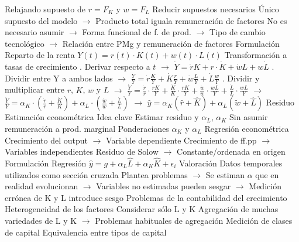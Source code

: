 \documentclass{nuevotema}
\begin{document}
\begin{esquemal}
				\4[] Relajando supuesto de $r=F_K$ y $w=F_L$
				\4 Reducir supuestos necesarios
				\4[] Único supuesto del modelo
				\4[] $\to$ Producto total iguala remuneración de factores
				\4[] No es necesario asumir
				\4[] $\to$ Forma funcional de f. de prod.
				\4[] $\to$ Tipo de cambio tecnológico
				\4[] $\to$ Relación entre PMg y remuneración de factores
			\3 Formulación
				\4 Reparto de la renta
				\4[] $Y(t) = r(t)\cdot K(t) + w(t) \cdot L(t)$
				\4 Transformación a tasas de crecimiento
				. Derivar respecto a $t$
				\4[] $\to$ $\dot{Y} = \dot{r} K + r \cdot \dot{K} + \dot{w} L + w \dot{L}$
				. Dividir entre Y a ambos lados
				\4[] $\to$ $ \frac{\dot{Y}}{Y} = \dot{r} \frac{K}{Y} + \dot{K} \frac{r}{Y} + \dot{w} \frac{L}{Y} + \dot{L} \frac{w}{Y}$
				. Dividir y multiplicar entre $r$, $K$, $w$ y $L$
				\4[] $\to$ $\frac{\dot{Y}}{Y} = \frac{\dot{r}}{r} \cdot \frac{rK}{Y} + \frac{\dot{K}}{K} \cdot \frac{rK}{Y} + \frac{\dot{w}}{w} \cdot \frac{wL}{Y} + \frac{\dot{L}}{L} \cdot \frac{wL}{Y}$
				\4[] $\to$ $\frac{\dot{Y}}{Y} = \alpha_K \cdot \left( \frac{\dot{r}}{r} + \frac{\dot{K}}{K} \right) + \alpha_L \cdot \left( \frac{\dot{w}}{w} + \frac{\dot{L}}{L} \right)$
				\4[] $\to$ $\hat{y} = \alpha_K \left( \hat{r} + \hat{K} \right) + \alpha_L \left( \tilde{w} + \hat{L} \right)$
				\4 Residuo
				\4[] 
		\2 Estimación econométrica
			\3 Idea clave
				\4 Estimar residuo y $\alpha_L$, $\alpha_K$
				\4[] Sin asumir remuneración a prod. marginal
				\4[] Ponderaciones $\alpha_K$ y $\alpha_L$
				\4 Regresión econométrica
				\4[] Crecimiento del output
				\4[] $\to$ Variable dependiente
				\4[] Crecimiento de ff.pp
				\4[] $\to$ Variables independientes
				\4[] Residuo de Solow
				\4[] $\to$ Constante/ordenada en origen
			\3 Formulación
				\4 Regresión
				\4[] $\hat{y} = g + \alpha_L \hat{L} + \alpha_K \hat{K} + \epsilon_i$
			\3 Valoración
				\4 Datos temporales utilizados como sección cruzada
				\4[] Plantea problemas
				\4[] $\to$ Se estiman $\alpha$ que en realidad evolucionan
				\4[] $\to$ Variables no estimadas pueden sesgar
				\4[] $\to$ Medición errónea de K y L introduce sesgo
		\2 Problemas de la contabilidad del crecimiento
			\3 Heterogeneidad de los factores
				\4 Considerar sólo L y K
				\4[] Agregación de muchas variedades de L y K
				\4[] $\to$ Problemas habituales de agregación
				\4 Medición de clases de capital
				\4[] Equivalencia entre tipos de capital

\end{esquemal}
\end{document}
